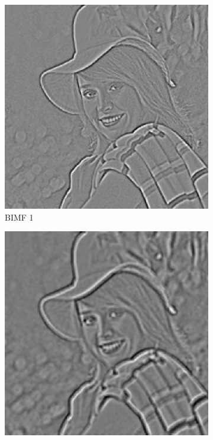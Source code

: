 \begin{figure}
\centering
\begin{subfigure}{.30\textwidth}
  \centering
  \includegraphics[width=.9\linewidth]{img/e_1_1_1}
  \caption{BIMF 1}
\end{subfigure}
\begin{subfigure}{.30\textwidth}
  \centering
  \includegraphics[width=.9\linewidth]{img/e_1_1_2}

\end{subfigure}
\end{figure}
